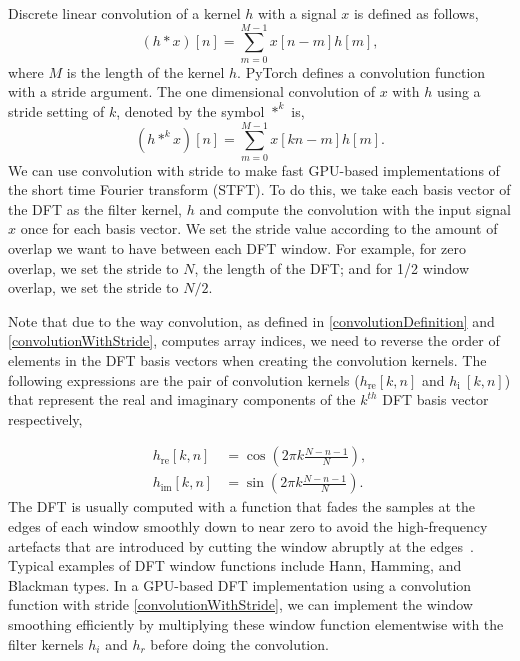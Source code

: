 \documentclass{ieeeaccess}
\begin{document}
Discrete linear convolution of a kernel $h$ with a signal $x$ is defined as follows,
\begin{equation}
    (h * x)[n] = \sum^{M-1}_{m=0}x[n-m]h[m],\label{convolutionDefinition}
\end{equation}
where $M$ is the length of the kernel $h$. PyTorch defines a convolution function with a stride argument. The one dimensional convolution of $x$ with $h$ using a stride setting of $k$, denoted by the symbol $*^k$ is,
\begin{equation}
    (h *^k x)[n] = \sum^{M-1}_{m=0}x[k n-m]h[m].\label{convolutionWithStride}
\end{equation}
We can use convolution with stride to make fast GPU-based implementations of the short time Fourier transform (STFT). To do this, we take each basis vector of the DFT as the filter kernel, $h$ and compute the convolution with the input signal $x$ once for each basis vector. We set the stride value according to the amount of overlap we want to have between each DFT window. For example, for zero overlap, we set the stride to $N$, the length of the DFT; and for 1/2 window overlap, we set the stride to $N/2$.


Note that due to the way convolution, as defined in \eqref{convolutionDefinition} and \eqref{convolutionWithStride}, computes array indices, we need to reverse the order of elements in the DFT basis vectors when creating the convolution kernels. The following expressions are the pair of convolution kernels ($h_{\text{re}}[k,n]$ and $h_{\text{i }}[k,n]$) that represent the real and imaginary components of the $k^{th}$ DFT basis vector respectively,


\begin{align}
    h_{\text{re}}[k,n] &= \cos(2\pi k \frac{N-n-1}{N}),\\
    h_{\text{im}}[k,n] &= \sin(2\pi k \frac{N-n-1}{N}).
\end{align}
The DFT is usually computed with a function that fades the samples at the edges of each window smoothly down to near zero to avoid the high-frequency artefacts that are introduced by cutting the window abruptly at the edges~\cite{Oppenheim1989DiscretetimeSP}. Typical examples of DFT window functions include Hann, Hamming, and Blackman types. In a GPU-based DFT implementation using a convolution function with stride \eqref{convolutionWithStride}, we can implement the window smoothing efficiently by multiplying these window function elementwise with the filter kernels $h_i$ and $h_r$ before doing the convolution. 
\end{document}

